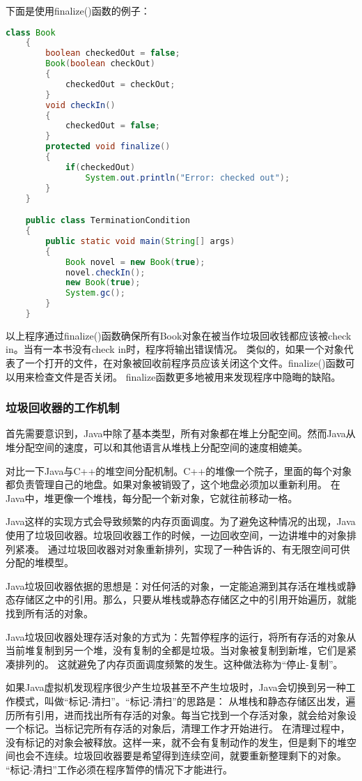 \documentclass[a4paper,left=2.5cm,right=2.5cm,11pt]{article}
\begin{document}
	下面是使用finalize()函数的例子：
	\begin{lstlisting}[language = Java]
	class Book
	{
		boolean checkedOut = false;
		Book(boolean checkOut)
		{
			checkedOut = checkOut;
		}
		void checkIn()
		{
			checkedOut = false;
		}
		protected void finalize()
		{
			if(checkedOut)
				System.out.println("Error: checked out");
		}
	}

	public class TerminationCondition
	{
		public static void main(String[] args)
		{
			Book novel = new Book(true);
			novel.checkIn();
			new Book(true);
			System.gc();
		}
	}
	\end{lstlisting}

	以上程序通过finalize()函数确保所有Book对象在被当作垃圾回收钱都应该被check in。当有一本书没有check in时，程序将输出错误情况。
	类似的，如果一个对象代表了一个打开的文件，在对象被回收前程序员应该关闭这个文件。finalize()函数可以用来检查文件是否关闭。
	finalize函数更多地被用来发现程序中隐晦的缺陷。

\subsubsection{垃圾回收器的工作机制}
	首先需要意识到，Java中除了基本类型，所有对象都在堆上分配空间。然而Java从堆分配空间的速度，可以和其他语言从堆栈上分配空间的速度相媲美。\par
	对比一下Java与C++的堆空间分配机制。C++的堆像一个院子，里面的每个对象都负责管理自己的地盘。如果对象被销毁了，这个地盘必须加以重新利用。
	在Java中，堆更像一个堆栈，每分配一个新对象，它就往前移动一格。\par
	Java这样的实现方式会导致频繁的内存页面调度。为了避免这种情况的出现，Java使用了垃圾回收器。垃圾回收器工作的时候，一边回收空间，一边讲堆中的对象排列紧凑。
	通过垃圾回收器对对象重新排列，实现了一种告诉的、有无限空间可供分配的堆模型。\par
	Java垃圾回收器依据的思想是：对任何活的对象，一定能追溯到其存活在堆栈或静态存储区之中的引用。那么，只要从堆栈或静态存储区之中的引用开始遍历，就能找到所有活的对象。\par
	Java垃圾回收器处理存活对象的方式为：先暂停程序的运行，将所有存活的对象从当前堆复制到另一个堆，没有复制的全都是垃圾。当对象被复制到新堆，它们是紧凑排列的。
	这就避免了内存页面调度频繁的发生。这种做法称为“停止-复制”。\par
	如果Java虚拟机发现程序很少产生垃圾甚至不产生垃圾时，Java会切换到另一种工作模式，叫做“标记-清扫”。“标记-清扫”的思路是：
	从堆栈和静态存储区出发，遍历所有引用，进而找出所有存活的对象。每当它找到一个存活对象，就会给对象设一个标记。当标记完所有存活的对象后，清理工作才开始进行。
	在清理过程中，没有标记的对象会被释放。这样一来，就不会有复制动作的发生，但是剩下的堆空间也会不连续。垃圾回收器要是希望得到连续空间，就要重新整理剩下的对象。
	“标记-清扫”工作必须在程序暂停的情况下才能进行。
\end{document}
